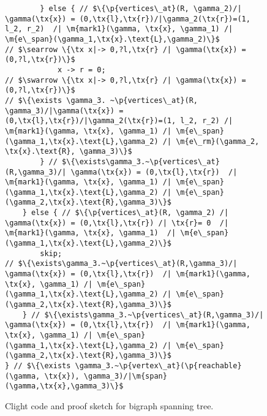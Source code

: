 \begin{figure*}
\begin{lstlisting}
        } else { // $\{\p{vertices\_at}(R, \gamma_2)/| \gamma(\tx{x}) = (0,\tx{l},\tx{r})/|\gamma_2(\tx{r})=(1, l_2, r_2)  /| \m{mark1}(\gamma, \tx{x}, \gamma_1) /| \m{e\_span}(\gamma_1,\tx{x}.\text{L},\gamma_2)\}$
// $\searrow \{\tx x|-> 0,?l,\tx{r} /| \gamma(\tx{x}) = (0,?l,\tx{r})\}$
            x -> r = 0;
// $\swarrow \{\tx x|-> 0,?l,\tx{r} /| \gamma(\tx{x}) = (0,?l,\tx{r})\}$
// $\{\exists \gamma_3. ~\p{vertices\_at}(R, \gamma_3)/|\gamma(\tx{x}) = (0,\tx{l},\tx{r})/|\gamma_2(\tx{r})=(1, l_2, r_2) /| \m{mark1}(\gamma, \tx{x}, \gamma_1) /| \m{e\_span}(\gamma_1,\tx{x}.\text{L},\gamma_2) /| \m{e\_rm}(\gamma_2, \tx{x}.\text{R}, \gamma_3)\}$
        } // $\{\exists\gamma_3.~\p{vertices\_at}(R,\gamma_3)/| \gamma(\tx{x}) = (0,\tx{l},\tx{r})  /| \m{mark1}(\gamma, \tx{x}, \gamma_1) /| \m{e\_span}(\gamma_1,\tx{x}.\text{L},\gamma_2) /| \m{e\_span}(\gamma_2,\tx{x}.\text{R},\gamma_3)\}$
    } else { // $\{\p{vertices\_at}(R, \gamma_2) /| \gamma(\tx{x}) = (0,\tx{l},\tx{r}) /| \tx{r}= 0  /| \m{mark1}(\gamma, \tx{x}, \gamma_1)  /| \m{e\_span}(\gamma_1,\tx{x}.\text{L},\gamma_2)\}$
        skip;
// $\{\exists\gamma_3.~\p{vertices\_at}(R,\gamma_3)/| \gamma(\tx{x}) = (0,\tx{l},\tx{r})  /| \m{mark1}(\gamma, \tx{x}, \gamma_1) /| \m{e\_span}(\gamma_1,\tx{x}.\text{L},\gamma_2) /| \m{e\_span}(\gamma_2,\tx{x}.\text{R},\gamma_3)\}$
    } // $\{\exists\gamma_3.~\p{vertices\_at}(R,\gamma_3)/| \gamma(\tx{x}) = (0,\tx{l},\tx{r})  /| \m{mark1}(\gamma, \tx{x}, \gamma_1) /| \m{e\_span}(\gamma_1,\tx{x}.\text{L},\gamma_2) /| \m{e\_span}(\gamma_2,\tx{x}.\text{R},\gamma_3)\}$
} // $\{\exists \gamma_3.~\p{vertex\_at}(\p{reachable}(\gamma, \tx{x}), \gamma_3)/|\m{span}(\gamma,\tx{x},\gamma_3)\}$
\end{lstlisting}

\caption{Clight code and proof sketch for bigraph spanning tree.}
\label{fig:spanning-full}

\end{figure*}

